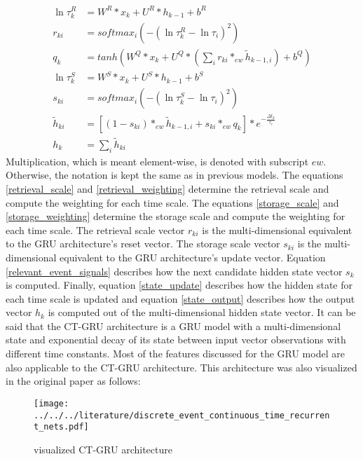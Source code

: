 \documentclass[draft,final]{vutinfth} %
\begin{document}
    \begin{align}
        \label{retrieval_scale}
        \ln{\tau_k^R} &= W^R*x_k + U^R*h_{k-1} + b^R \\
        \label{retrieval_weighting}
        r_{ki} &= softmax_i(-(\ln{\tau_k^R-\ln{\tau_i}})^2) \\
        \label{relevant_event_signals}
        q_k &= tanh(W^Q*x_k + U^Q*(\sum_i {r_{ki} *_{ew} \tilde{h}_{k-1,i}}) + b^Q) \\
        \label{storage_scale}
        \ln{\tau_k^S} &= W^S*x_k + U^S*h_{k-1} + b^S \\
        \label{storage_weighting}
        s_{ki} &= softmax_i(-(\ln{\tau_k^S-\ln{\tau_i}})^2) \\
        \label{state_update}
        \tilde{h}_{ki} &= [(1 - s_{ki}) *_{ew} \tilde{h}_{k-1,i} + s_{ki} *_{ew} q_k] * e^{-\frac{\Delta t_k}{\tau_i}} \\
        \label{state_output}
        h_k &= \sum_i{\tilde{h}_{ki}}
    \end{align}
    Multiplication, which is meant element-wise, is denoted with subscript $ew$. Otherwise, the notation is kept the same as in previous models.
    The equations \ref{retrieval_scale} and \ref{retrieval_weighting} determine the retrieval scale and compute the weighting for each time scale.
    The equations \ref{storage_scale} and \ref{storage_weighting} determine the storage scale and compute the weighting for each time scale.
    The retrieval scale vector $r_{ki}$ is the multi-dimensional equivalent to the GRU architecture's reset vector. The storage scale vector $s_{ki}$ is the multi-dimensional equivalent to the GRU architecture's update vector.
    Equation \ref{relevant_event_signals} describes how the next candidate hidden state vector $s_k$ is computed.
    Finally, equation \ref{state_update} describes how the hidden state for each time scale is updated and equation \ref{state_output} describes how the output vector $h_k$ is computed out of the multi-dimensional hidden state vector.
    It can be said that the CT-GRU architecture is a GRU model with a multi-dimensional state and exponential decay of its state between input vector observations with different time constants.
    Most of the features discussed for the GRU model are also applicable to the CT-GRU architecture.
    This architecture was also visualized in the original paper as follows:
    \begin{figure}[H]
        \centering{}
        \texttt{[image: ../../../literature/discrete\_event\_continuous\_time\_recurrent\_nets.pdf]}
        \caption{visualized CT-GRU architecture \cite[p. 4]{CTGRU}}
        \label{fig:ct_gru_vis}
    \end{figure}
\end{document}
